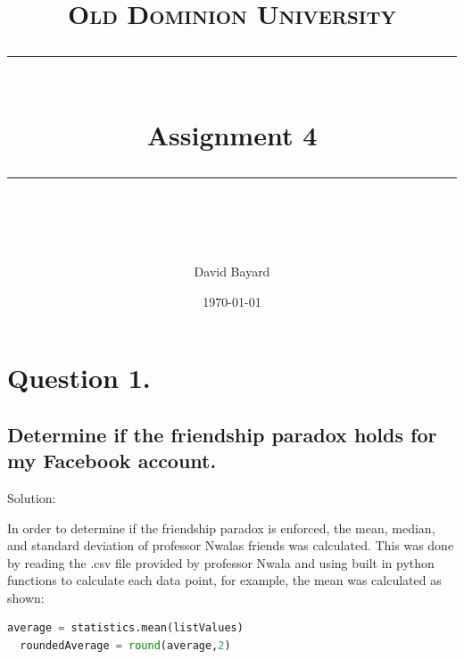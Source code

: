\documentclass[11pt]{scrartcl} %
\title{
	\normalfont\normalsize
	\textsc{Old Dominion University}\\ %
	\vspace{25pt} %
	\rule{\linewidth}{0.5pt}\\ %
	\vspace{20pt} %
	{\huge Assignment 4}\\ %
	\vspace{12pt} %
	\rule{\linewidth}{2pt}\\ %
	\vspace{12pt} %
}
\author{\LARGE David Bayard} %
\date{\normalsize\today} %
\begin{document}

\lstset{style=pythonStyle}


\maketitle %

\pagebreak
\section*{Question 1.}




\subsection*{Determine if the friendship paradox holds for my Facebook
account.}
\bigskip\bigskip


\LARGE Solution:
\newline \newline\small

\tabto{2.0cm} In order to determine if the friendship paradox is enforced, the mean, median, and standard deviation of professor Nwalas friends was calculated. This was done by reading the .csv file provided by professor Nwala and using built in python functions to calculate each data point, for example, the mean was calculated as shown:

\begin{lstlisting}[language = Python, caption=Calculating Mean]
  average = statistics.mean(listValues)
  roundedAverage = round(average,2)
\end{lstlisting} \bigskip 
\end{document}
